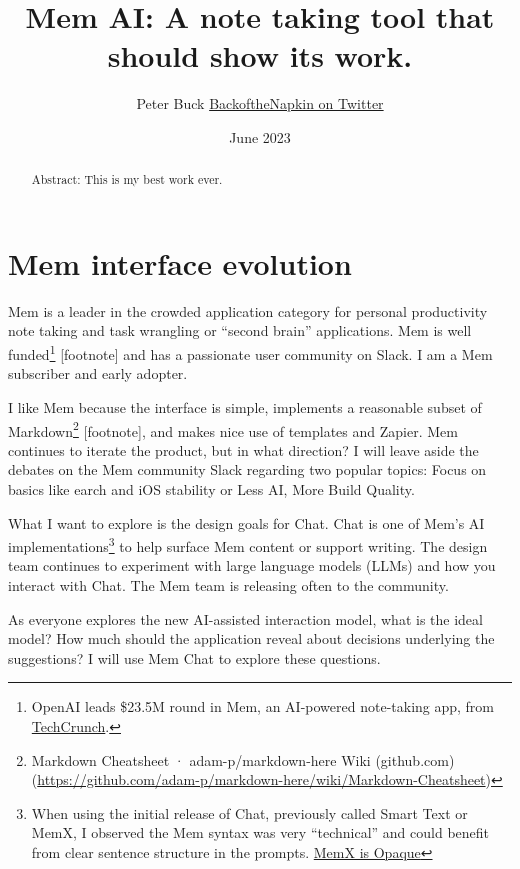 \documentclass[]{tufte-handout}
\title[Cortex Thoughts on Mem AI: Show Your Work]{Mem AI: A note taking
tool that should show its work.}
\author{Peter Buck \textbar{}
\href{https://twitter.com/backofthenapkin}{BackoftheNapkin on Twitter}}
\date{June 2023}
\begin{document}
\maketitle

\begin{abstract}
\noindent Abstract: This is my best work ever.
\end{abstract}



\hypertarget{mem-interface-evolution}{%
\section{Mem interface evolution}\label{mem-interface-evolution}}

Mem is a leader in the crowded application category for personal
productivity note taking and task wrangling or ``second brain''
applications. Mem is well funded\footnote{OpenAI leads \$23.5M round in
  Mem, an AI-powered note-taking app, from
  \href{https://techcrunch.com/2022/11/10/ai-powered-note-taking-app-mem-raises-23-5m-openai/}{TechCrunch}.}
{[}footnote{]} and has a passionate user community on Slack. I am a Mem
subscriber and early adopter.

I like Mem because the interface is simple, implements a reasonable
subset of Markdown\footnote{Markdown Cheatsheet · adam-p/markdown-here
  Wiki (github.com)
  (\url{https://github.com/adam-p/markdown-here/wiki/Markdown-Cheatsheet})}
{[}footnote{]}, and makes nice use of templates and Zapier. Mem
continues to iterate the product, but in what direction? I will leave
aside the debates on the Mem community Slack regarding two popular
topics: Focus on basics like earch and iOS stability or Less AI, More
Build Quality.

What I want to explore is the design goals for Chat. Chat is one of
Mem's AI implementations\footnote{When using the initial release of
  Chat, previously called Smart Text or MemX, I observed the Mem syntax
  was very ``technical'' and could benefit from clear sentence structure
  in the prompts. \href{https://mem.ai/p/8MNks0EqWJ5MQchy80ZG}{MemX is
  Opaque}} to help surface Mem content or support writing. The design
team continues to experiment with large language models (LLMs) and how
you interact with Chat. The Mem team is releasing often to the
community.

As everyone explores the new AI-assisted interaction model, what is the
ideal model? How much should the application reveal about decisions
underlying the suggestions? I will use Mem Chat to explore these
questions.
\end{document}
